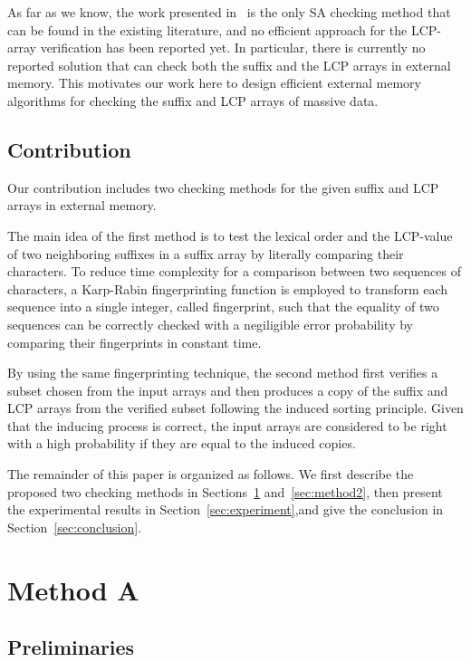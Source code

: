 \documentclass[10pt,journal,compsoc]{IEEEtran}
\begin{document}
As far as we know, the work presented in~\cite{Burkhardt2003} is the only SA checking method that can be found in the existing literature, and no efficient approach for the LCP-array verification has been reported yet. In particular, there is currently no reported solution that can check both the suffix and the LCP arrays in external memory. This motivates our work here to design efficient external memory algorithms for checking the suffix and LCP arrays of massive data.
	
\subsection{Contribution}\label{sec:introduction:contribution}

Our contribution includes two checking methods for the given suffix and LCP arrays in external memory. 

The main idea of the first method is to test the lexical order and the LCP-value of two neighboring suffixes in a suffix array by literally comparing their characters. To reduce time complexity for a comparison between two sequences of characters, a Karp-Rabin fingerprinting function is employed to transform each sequence into a single integer, called fingerprint, such that the equality of two sequences can be correctly checked with a negiligible error probability by comparing their fingerprints in constant time. 

By using the same fingerprinting technique, the second method first verifies a subset chosen from the input arrays and then produces a copy of the suffix and LCP arrays from the verified subset following the induced sorting principle. Given that the inducing process is correct, the input arrays are considered to be right with a high probability if they are equal to the induced copies. 

The remainder of this paper is organized as follows. We first describe the proposed two checking methods in Sections~\ref{sec:method1} and~\ref{sec:method2}, then present the experimental results in Section~\ref{sec:experiment},and give the conclusion in Section~\ref{sec:conclusion}.


\section{Method A} \label{sec:method1}


\subsection{Preliminaries} \label{sec:method1:notations}
\end{document}
